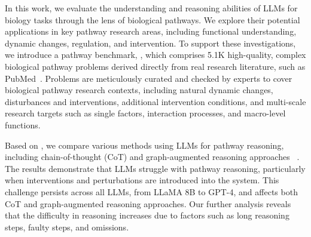 



In this work, we evaluate the understanding and reasoning abilities of LLMs for biology tasks through the lens of biological pathways. We explore their potential applications in key pathway research areas, including functional understanding, dynamic changes, regulation, and intervention. To support these investigations, we introduce a pathway benchmark, \benchname, which comprises 5.1K high-quality, complex biological pathway problems derived directly from real research literature, such as PubMed~\citep{lu2011pubmed}. Problems are meticulously curated and checked by experts to cover biological pathway research contexts, including natural dynamic changes, disturbances and interventions, additional intervention conditions, and multi-scale research targets such as single factors, interaction processes, and macro-level functions.

Based on \benchname, we compare various methods using LLMs for pathway reasoning, including chain-of-thought (CoT) and graph-augmented reasoning approaches ~\citep{li2023chain, sun2023think, he2024g}. The results demonstrate that LLMs struggle with pathway reasoning, particularly when interventions and perturbations are introduced into the system. This challenge persists across all LLMs, from LLaMA 8B to GPT-4, and affects both CoT and graph-augmented reasoning approaches. Our further analysis reveals that the difficulty in reasoning increases due to factors such as long reasoning steps, faulty steps, and omissions.

